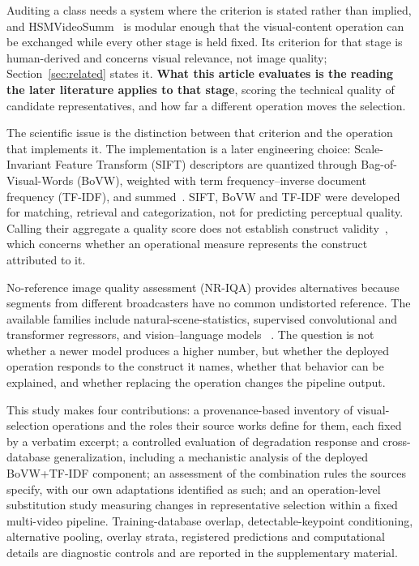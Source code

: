 Auditing a class needs a system where the criterion is stated rather than implied, and
HSMVideoSumm~\citep{barbieri2021content,barbieri2021tese} is modular enough that the
visual-content operation can be exchanged while every other stage is held fixed. Its
criterion for that stage is human-derived and concerns visual relevance, not image quality;
Section~\ref{sec:related} states it. \textbf{What this article evaluates is the reading the
later literature applies to that stage}, scoring the technical quality of candidate
representatives, and how far a different operation moves the selection.

The scientific issue is the distinction between that criterion and the operation
that implements it. The implementation is a later engineering choice:
Scale-Invariant Feature Transform (SIFT) descriptors are quantized through
Bag-of-Visual-Words (BoVW), weighted with term frequency--inverse document
frequency (TF-IDF), and summed~\citep{lowe2004sift,sivic2003videogoogle,
csurka2004bovw,salton1988tfidf}. SIFT, BoVW and TF-IDF were developed for
matching, retrieval and categorization, not for predicting perceptual quality.
Calling their aggregate a quality score does not establish construct
validity~\citep{cronbach1955construct}, which concerns whether an operational measure
represents the construct attributed to it.

No-reference image quality assessment (NR-IQA) provides alternatives because
segments from different broadcasters have no common undistorted reference. The
available families include natural-scene-statistics, supervised convolutional
and transformer regressors, and vision--language models
~\citep{mittal2012brisque,mittal2013niqe,ke2021musiq,zhang2023liqe,
agnolucci2024qualiclip}. The question is not whether a newer model produces a
higher number, but whether the deployed operation responds to the construct it
names, whether that behavior can be explained, and whether replacing the
operation changes the pipeline output.

This study makes four contributions: a provenance-based inventory of visual-selection
operations and the roles their source works define for them, each fixed by a verbatim
excerpt; a controlled evaluation of degradation response and cross-database generalization,
including a mechanistic analysis of the deployed BoVW+TF-IDF component; an assessment of the
combination rules the sources specify, with our own adaptations identified as such; and an
operation-level substitution study measuring changes in representative selection within a
fixed multi-video pipeline. Training-database overlap,
detectable-keypoint conditioning, alternative pooling, overlay strata,
registered predictions and computational details are diagnostic controls and are reported
in the supplementary material.

